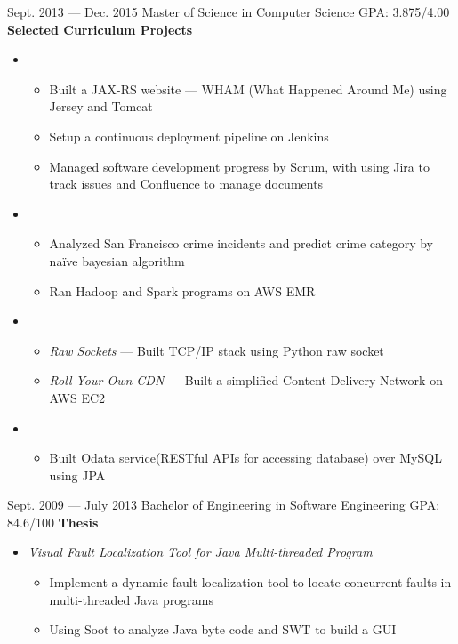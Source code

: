 \documentclass{newresume}
\begin{document}
\begin{body}
	{Sept. 2013 --- Dec. 2015}
	{Master of Science in Computer Science}
	{GPA: 3.875/4.00}
	\textbf{Selected Curriculum Projects}
	\begin{itemize}
	\item {}
	\begin{itemize}
		\item Built a JAX-RS website --- WHAM (What Happened Around Me) using Jersey and Tomcat
		\item Setup a continuous deployment pipeline on Jenkins
		\item Managed software development progress by Scrum, with using Jira to track issues and Confluence to manage documents
	\end{itemize}

	\item {}
	\begin{itemize}
		\item Analyzed San Francisco crime incidents and predict crime category by na\"{i}ve bayesian algorithm
		\item Ran Hadoop and Spark programs on AWS EMR
	\end{itemize}

	\item {}
	\begin{itemize}
		\item \textit{Raw Sockets} --- Built TCP/IP stack using Python raw socket
		\item \textit{Roll Your Own CDN} --- Built a simplified Content Delivery Network on AWS EC2
	\end{itemize}

	\item {}
	\begin{itemize}
		\item Built Odata service(RESTful APIs for accessing database) over MySQL using JPA
	\end{itemize}

	\end{itemize}
\end{body}

\begin{body}
	{Sept. 2009 --- July 2013}
	{Bachelor of Engineering in Software Engineering}
	{GPA: 84.6/100}
	\textbf{Thesis}
	\begin{itemize}
	\item \textit{Visual Fault Localization Tool for Java Multi-threaded Program}
	\begin{itemize}
		\item Implement a dynamic fault-localization tool to locate concurrent faults in multi-threaded Java programs
		\item Using Soot to analyze Java byte code and SWT to build a GUI
	\end{itemize}
	\end{itemize}
\end{body}
\end{document}
